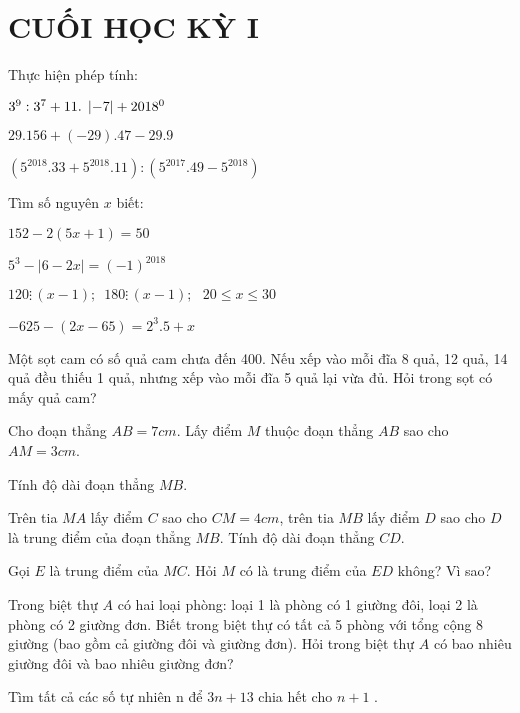 \section{CUỐI HỌC KỲ I}
\setcounter{ex}{0}
\begin{ex}
	Thực hiện phép tính:
	\begin{listEX}
	\item ${3^9}:{\rm{ }}{{\rm{3}}^7} + {\rm{ 11}}.\;\left| { - 7} \right| + {\rm{ }}{2018^0}$ 
\item $29.156 + \left( { - 29} \right).47 - 29.9$
\item $\left( {{5^{2018}}.33 + {5^{2018}}.11} \right):\left( {{5^{2017}}.49 - {5^{2018}}} \right)$ 
	\end{listEX}
\end{ex}
\begin{ex}
	Tìm số nguyên $x$ biết:
	\begin{listEX}[2]
	\item $152 - 2\left( {5x + 1} \right) = 50$
\item ${5^3} - \left| {6 - 2x} \right| = {\left( { - 1} \right)^{2018}}$
\item $120 \vdots \,\left( {x - 1} \right);\,\,\,180 \vdots \,\left( {x - 1} \right);\,\,\,\,20 \le x \le 30$
\item $ - 625 - \left( {2x - 65} \right) = {2^3}.5 + x$
	\end{listEX}
\end{ex}
\begin{ex}
	Một sọt cam có số quả cam chưa đến 400. Nếu xếp vào mỗi đĩa  8 quả, 12  quả, 14  quả đều thiếu 1 quả, nhưng xếp vào mỗi đĩa 5 quả lại vừa đủ. Hỏi trong sọt có mấy quả cam?
\end{ex}
\begin{ex}
	Cho đoạn thẳng $AB = 7cm$. Lấy điểm $M$ thuộc đoạn thẳng $AB$ sao cho $AM = 3cm$.
		\begin{listEX}
			\item Tính độ dài đoạn thẳng $MB$.
\item Trên tia $MA$ lấy điểm $C$ sao cho $CM = 4cm$, trên tia $MB$ lấy điểm $D$ sao cho $D$ là trung điểm của đoạn thẳng $MB$. Tính độ dài đoạn thẳng $CD$.
\item Gọi $E$ là trung điểm của $MC$. Hỏi $M$ có là trung điểm của $ED$ không? Vì sao?
		\end{listEX}
\end{ex}
\begin{ex}
	Trong biệt thự $A$ có hai loại phòng: loại 1 là phòng có 1 giường đôi, loại 2 là phòng có 2 giường đơn. Biết trong biệt thự có tất cả 5 phòng với tổng cộng 8 giường (bao gồm cả giường đôi và giường đơn). Hỏi trong biệt thự $A$ có bao nhiêu giường đôi và bao nhiêu giường đơn?
\end{ex}
\begin{ex}
	Tìm tất cả các số tự nhiên n để $3n+13$ chia hết cho $n + 1$ .
\end{ex}